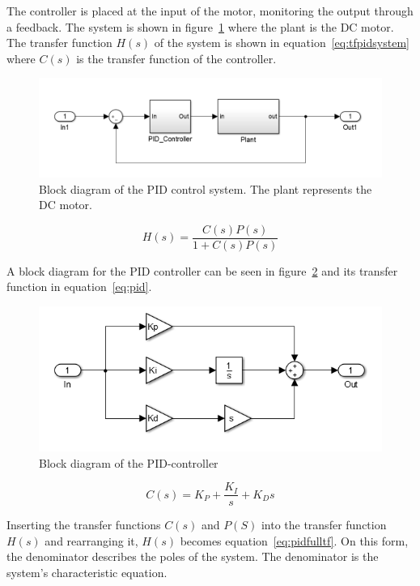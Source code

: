  The controller is placed at the input of the motor, monitoring the output through a feedback. 
 The system is shown in figure~\ref{fig:pidcontrolsystem} where the plant is the DC motor. 
 The transfer function $H(s)$ of the system is shown in equation~\ref{eq:tfpidsystem} where $C(s)$ is the transfer function of the controller.

\begin{figure}[!h]
	\centering
	\includegraphics[width=.75\linewidth]{graphics/controlsystem}
	\caption{Block diagram of the PID control system. The plant represents the DC motor.}
	\label{fig:pidcontrolsystem}	
\end{figure}

\begin{equation}
\label{eq:tfpidsystem}
H(s) = \dfrac{C(s)P(s)}{1+C(s)P(s)}
\end{equation}

A block diagram for the PID controller can be seen in figure~\ref{fig:pidblock} and its transfer function in equation~\ref{eq:pid}.  

\begin{figure}[!h]
	\centering
	\includegraphics[width=.7\linewidth]{graphics/pidcontroller}
	\caption{Block diagram of the PID-controller}
	\label{fig:pidblock}
\end{figure}

\begin{equation}
\label{eq:pid}
C(s) = K_P + \dfrac{K_I}{s} +K_D s
\end{equation}

Inserting the transfer functions $C(s)$ and $P(S)$ into the transfer function $H(s)$ and rearranging it, $H(s)$ becomes equation~\ref{eq:pidfulltf}. On this form, the denominator describes the poles of the system. The denominator is the system's characteristic equation.

